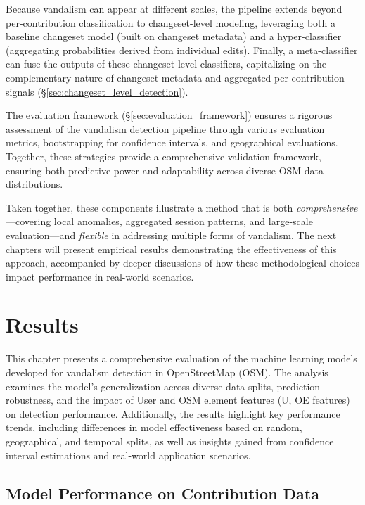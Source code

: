 \documentclass[
    13pt, %
    a4paper, %
    listof=totoc, %
    bibliography=totoc, %
    index=totoc, %
    headsepline
]{scrreprt}
\begin{document}
Because vandalism can appear at different scales, the pipeline extends beyond per-contribution classification to changeset-level modeling, leveraging both a baseline changeset model (built on changeset metadata) and a hyper-classifier (aggregating probabilities derived from individual edits). Finally, a meta-classifier can fuse the outputs of these changeset-level classifiers, capitalizing on the complementary nature of changeset metadata and aggregated per-contribution signals (\S\ref{sec:changeset_level_detection}).

The evaluation framework (\S\ref{sec:evaluation_framework}) ensures a rigorous assessment of the vandalism detection pipeline through various evaluation metrics, bootstrapping for confidence intervals, and geographical evaluations. Together, these strategies provide a comprehensive validation framework, ensuring both predictive power and adaptability across diverse OSM data distributions.

Taken together, these components illustrate a method that is both \emph{comprehensive}—covering local anomalies, aggregated session patterns, and large-scale evaluation—and \emph{flexible} in addressing multiple forms of vandalism. The next chapters will present empirical results demonstrating the effectiveness of this approach, accompanied by deeper discussions of how these methodological choices impact performance in real-world scenarios.


\chapter{Results}
\label{chapter:model_performance}

This chapter presents a comprehensive evaluation of the machine learning models developed for vandalism detection in OpenStreetMap (OSM). The analysis examines the model's generalization across diverse data splits, prediction robustness, and the impact of User and OSM element features (U, OE features) on detection performance. Additionally, the results highlight key performance trends, including differences in model effectiveness based on random, geographical, and temporal splits, as well as insights gained from confidence interval estimations and real-world application scenarios.

\section{Model Performance on Contribution Data}
\label{sec:contribution_model_perf}
\end{document}
